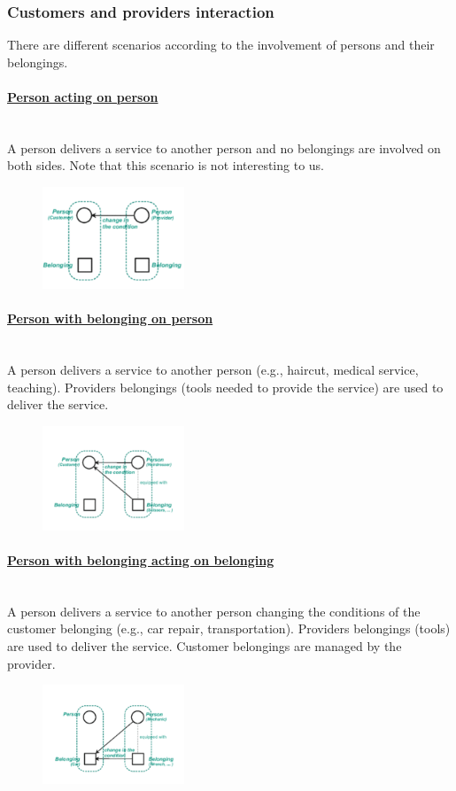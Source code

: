 \documentclass[10pt,a4paper]{article}
\newcommand{\myparagraph}[1]{\paragraph{\uline{#1}}\mbox{}\\[0.05in]}
\begin{document}
\subsubsection{Customers and providers interaction}
There are different scenarios according to the involvement of persons and their belongings.
\myparagraph{Person acting on person}
A person delivers a service to another person and no belongings are involved on both sides. Note that this scenario is not interesting to us.
\begin{figure}[h!]
 \hfill \includegraphics[width=120pt]{images/person-person}\hspace*{\fill}
  \label{fig:person-person}
\end{figure}
\myparagraph{Person with belonging on person}
A person delivers a service to another person (e.g., haircut, medical service, teaching). Providers belongings (tools needed to provide the service) are used to deliver the service.
\begin{figure}[h!]
 \hfill \includegraphics[width=120pt]{images/person-b-person}\hspace*{\fill}
  \label{fig:person-b-person}
\end{figure}
\myparagraph{Person with belonging acting on belonging}
A person delivers a service to another person changing the conditions of the customer belonging (e.g., car repair, transportation). Providers belongings (tools) are used to deliver the service. Customer belongings are managed by the provider.
\begin{figure}[h!]
 \hfill \includegraphics[width=120pt]{images/person-belonging}\hspace*{\fill}
  \label{fig:person-belonging}
\end{figure}
\end{document}
